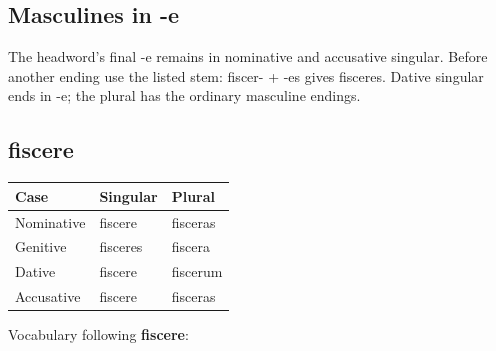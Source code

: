 \subsection*{Masculines in -e}

The headword’s final -e remains in nominative and accusative singular. Before another ending use the listed stem: fiscer- + -es gives fisceres. Dative singular ends in -e; the plural has the ordinary masculine endings.

\subsection*{fiscere}

\par\begingroup
\fontsize{10.5}{13.2}\selectfont
\setlength{\LTleft}{0pt}\setlength{\LTright}{\fill}
\noindent
\begin{tabular}{@{}>{\raggedright\arraybackslash}p{39.46mm}>{\raggedright\arraybackslash}p{39.46mm}>{\raggedright\arraybackslash}p{39.46mm}@{}}
\toprule
\textbf{Case} & \textbf{Singular} & \textbf{Plural} \\
\midrule
Nominative & fiscere & fisceras \\
Genitive & fisceres & fiscera \\
Dative & fiscere & fiscerum \\
Accusative & fiscere & fisceras \\
\bottomrule
\end{tabular}
\par\endgroup

Vocabulary following \textbf{fiscere}:

